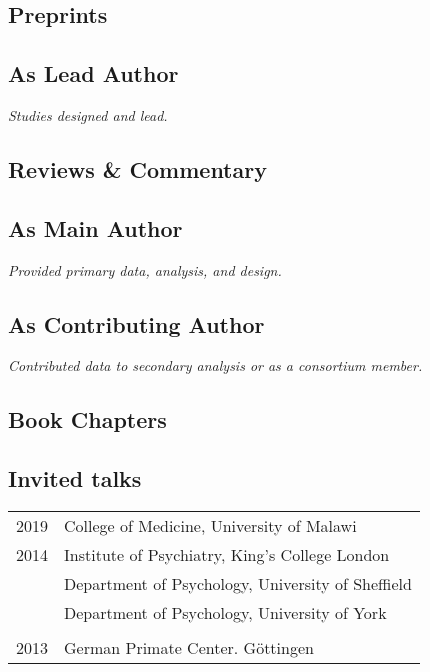 \documentclass[11pt]{article}
\begin{document}
\subsection*{Preprints}

\printbibliography[type=article,keyword=preprint,heading=none]

\subsection*{As Lead Author}

\textit{Studies designed and lead.}

\printbibliography[type=article,keyword=lead,heading=none]

\subsection*{Reviews \& Commentary}

\printbibliography[type=article,keyword=review,heading=none]

\subsection*{As Main Author}

\textit{Provided primary data, analysis, and design.} 

\printbibliography[type=article,keyword=main,heading=none]

\subsection*{As Contributing Author}

\textit{Contributed data to secondary analysis or as a consortium member.}

\printbibliography[type=article,keyword=contrib,heading=none]

\subsection*{Book Chapters}

\printbibliography[type=inbook,heading=none]

\subsection*{Invited talks}

\begin{tabular}{p{3cm}p{12cm}}
	
2019 & College of Medicine, University of Malawi \\
	
2014 & Institute of Psychiatry, King's College London \\

     & Department of Psychology, University of Sheffield \\

    & Department of Psychology, University of York \\ \\

2013 & German Primate Center. Göttingen

\end{tabular}
\end{document}
